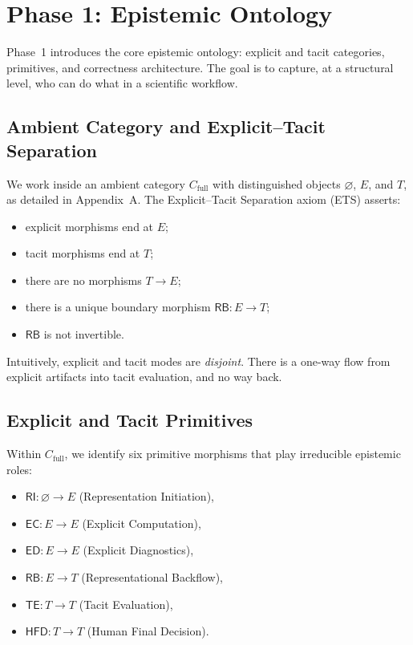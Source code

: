 \documentclass[11pt]{article}
\theoremstyle{definition}
\newcommand{\Cfull}{C_{\mathrm{full}}}
\newcommand{\RB}{\mathsf{RB}}   %
\newcommand{\RI}{\mathsf{RI}}
\newcommand{\EC}{\mathsf{EC}}
\newcommand{\ED}{\mathsf{ED}}
\newcommand{\TE}{\mathsf{TE}}
\newcommand{\HFD}{\mathsf{HFD}}
\begin{document}
\section{Phase 1: Epistemic Ontology}
\label{sec:phase1}

Phase~1 introduces the core epistemic ontology: explicit and tacit
categories, primitives, and correctness architecture. The goal is to
capture, at a structural level, who can do what in a scientific
workflow.

\subsection{Ambient Category and Explicit--Tacit Separation}

We work inside an ambient category \(\Cfull\) with distinguished objects
\(\varnothing\), \(E\), and \(T\), as detailed in Appendix~A. The
Explicit--Tacit Separation axiom (ETS) asserts:

\begin{itemize}[leftmargin=2em]
  \item explicit morphisms end at \(E\);
  \item tacit morphisms end at \(T\);
  \item there are no morphisms \(T \to E\);
  \item there is a unique boundary morphism \(\RB:E\to T\);
  \item \(\RB\) is not invertible.
\end{itemize}

Intuitively, explicit and tacit modes are \emph{disjoint}. There is a
one-way flow from explicit artifacts into tacit evaluation, and no way
back.

\subsection{Explicit and Tacit Primitives}

Within \(\Cfull\), we identify six primitive morphisms that play
irreducible epistemic roles:

\begin{itemize}[leftmargin=2em]
  \item \(\RI : \varnothing \to E\) (Representation Initiation),
  \item \(\EC : E \to E\) (Explicit Computation),
  \item \(\ED : E \to E\) (Explicit Diagnostics),
  \item \(\RB : E \to T\) (Representational Backflow),
  \item \(\TE : T \to T\) (Tacit Evaluation),
  \item \(\HFD : T \to T\) (Human Final Decision).
\end{itemize}
\end{document}
